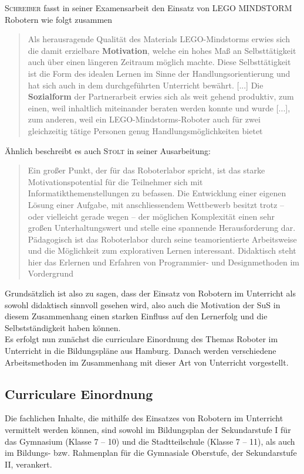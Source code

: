 \documentclass[paper=a4, pagesize, DIV=calc, BCOR=12.5mm, twoside=on, onecolumn=on, open = any, titlepage =on, parskip =half-, headsepline = on, footsepline = on, chapterprefix = on, appendixprefix = off, fontsize = 12pt, numbers = noenddot, abstract = on]{scrbook}
\numberwithin{equation}{chapter}
\theoremstyle{definition}
\theoremstyle{plain}
\theoremstyle{plain}
\theoremstyle{remark}
\theoremstyle{plain}
\theoremstyle{plain}
\begin{document}
\textsc{Schreiber} fasst in seiner Examensarbeit den Einsatz von LEGO MINDSTORM Robotern wie folgt zusammen
\begin{quote}
Als herausragende Qualität des Materials LEGO-Mindstorms erwies sich die damit erzielbare \textbf{Motivation}, welche ein hohes Maß an Selbsttätigkeit auch über einen längeren Zeitraum möglich machte. Diese Selbsttätigkeit ist die Form des idealen Lernen im Sinne der Handlungsorientierung und hat sich auch in dem durchgeführten Unterricht bewährt. [...] Die \textbf{Sozialform} der Partnerarbeit erwies sich als weit gehend produktiv, zum einen, weil inhaltlich miteinander beraten werden konnte und wurde [...], zum anderen, weil ein LEGO-Mindstorms-Roboter auch für zwei gleichzeitig tätige Personen genug Handlungsmöglichkeiten bietet \cite[S.47f.]{schreiber:04}
\end{quote}
Ähnlich beschreibt es auch \textsc{Stolt} in seiner Ausarbeitung:
\begin{quote}
Ein großer Punkt, der für das Roboterlabor spricht, ist das starke Motivationspotential für die Teilnehmer sich mit Informatikthemenstellungen zu befassen. Die Entwicklung einer eigenen Lösung einer Aufgabe, mit anschliessendem Wettbewerb besitzt trotz – oder vielleicht gerade wegen – der möglichen Komplexität einen sehr großen Unterhaltungswert und stelle eine spannende Herausforderung dar. Pädagogisch ist das Roboterlabor durch seine teamorientierte Arbeitsweise und die Möglichkeit zum explorativen Lernen interessant. Didaktisch steht hier das Erlernen und Erfahren von Programmier- und Designmethoden im Vordergrund \cite[S.5f.]{stolt:01}
\end{quote}

Grundsätzlich ist also zu sagen, dass der Einsatz von Robotern im Unterricht als sowohl didaktisch sinnvoll gesehen wird, also auch die Motivation der SuS in diesem Zusammenhang einen starken Einfluss auf den Lernerfolg und die Selbstständigkeit haben können.\\

Es erfolgt nun zunächst die curriculare Einordnung des Themas Roboter im Unterricht in die Bildungspläne aus Hamburg. Danach werden verschiedene Arbeitsmethoden im Zusammenhang mit dieser Art von Unterricht vorgestellt.

\subsection{Curriculare Einordnung}
Die fachlichen Inhalte, die mithilfe des Einsatzes von Robotern im Unterricht vermittelt werden können, sind sowohl im Bildungsplan der Sekundarstufe I für das Gymnasium (Klasse 7 -- 10) und die Stadtteilschule (Klasse 7 -- 11), als auch im Bildungs- bzw. Rahmenplan für die Gymnasiale Oberstufe, der Sekundarstufe II, verankert.
\end{document}
